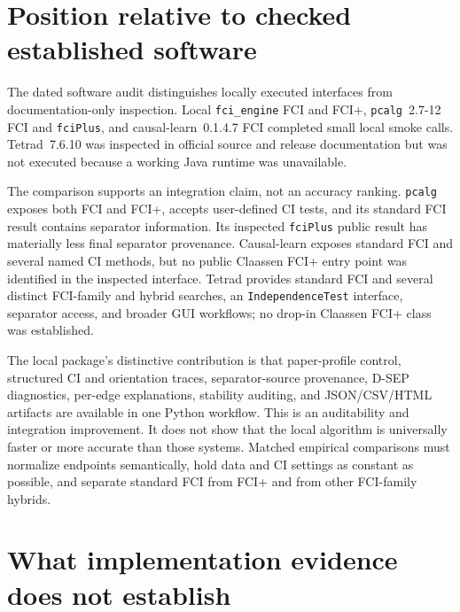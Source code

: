 \documentclass[11pt,a4paper,oneside]{report}
\newcommand{\code}[1]{\texttt{#1}}
\begin{document}
\section{Position relative to checked established software}

The dated software audit distinguishes locally executed interfaces from
documentation-only inspection.  Local \code{fci\_engine} FCI and FCI+,
\code{pcalg}~2.7-12 FCI and \code{fciPlus}, and causal-learn~0.1.4.7 FCI
completed small local smoke calls.  Tetrad~7.6.10 was inspected in official
source and release documentation but was not executed because a working Java
runtime was unavailable.

The comparison supports an integration claim, not an accuracy ranking.
\code{pcalg} exposes both FCI and FCI+, accepts user-defined CI tests, and its
standard FCI result contains separator information.  Its inspected
\code{fciPlus} public result has materially less final separator provenance.
Causal-learn exposes standard FCI and several named CI methods, but no public
Claassen FCI+ entry point was identified in the inspected interface.  Tetrad
provides standard FCI and several distinct FCI-family and hybrid searches, an
\code{IndependenceTest} interface, separator access, and broader GUI
workflows; no drop-in Claassen FCI+ class was established.

The local package's distinctive contribution is that paper-profile control,
structured CI and orientation traces, separator-source provenance, D-SEP
diagnostics, per-edge explanations, stability auditing, and JSON/CSV/HTML
artifacts are available in one Python workflow.  This is an auditability and
integration improvement.  It does not show that the local algorithm is
universally faster or more accurate than those systems.  Matched empirical
comparisons must normalize endpoints semantically, hold data and CI settings
as constant as possible, and separate standard FCI from FCI+ and from other
FCI-family hybrids.

\section{What implementation evidence does not establish}
\label{sec:implementation-not-established}
\end{document}
